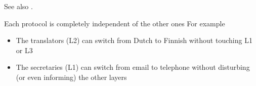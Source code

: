 See also .

\begin{frame}%
  \begin{center}
    \label{fig:translator}%
  \end{center}
\end{frame}

\begin{frame}
  \begin{iblock}{Each protocol is completely independent of the other ones}
    For example
    \begin{itemize}
    \item The translators (L2) can switch from Dutch to Finnish without touching L1 or L3
    \item The secretaries (L1) can switch from email to telephone without disturbing (or
      even informing) the other layers
    \end{itemize}
  \end{iblock}
\end{frame}

